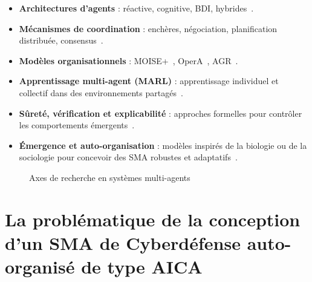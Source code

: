 \documentclass[ twoside,openright,titlepage,numbers=noenddot,headinclude,%
                footinclude=true,cleardoublepage=empty,abstractoff, %
                BCOR=5mm,paper=a4,fontsize=11pt,%
                french,american,%
                ]{scrreprt}
\begin{document}
\begin{itemize}
    \item \textbf{Architectures d'agents} : réactive, cognitive, BDI, hybrides~\cite{Georgeff1999}.
    \item \textbf{Mécanismes de coordination} : enchères, négociation, planification distribuée, consensus~\cite{Sandholm1999,Durfee1999}.
    \item \textbf{Modèles organisationnels} : MOISE+~\cite{Hubner2002,Hannoun2000}, OperA~\cite{Dignum2004}, AGR~\cite{Ferber2003}.
    \item \textbf{Apprentissage multi-agent (MARL)} : apprentissage individuel et collectif dans des environnements partagés~\cite{Zhang2021}.
    \item \textbf{Sûreté, vérification et explicabilité} : approches formelles pour contrôler les comportements émergents~\cite{Boella2008}.
    \item \textbf{Émergence et auto-organisation} : modèles inspirés de la biologie ou de la sociologie pour concevoir des SMA robustes et adaptatifs~\cite{DiMarzoSerugendo2005,Heylighen2001}.
\end{itemize}

\begin{figure}[h]
    \centering
    \caption{Axes de recherche en systèmes multi-agents}
    \label{fig:panorama_sma}
\end{figure}


\section{La problématique de la conception d'un SMA de Cyberdéfense auto-organisé de type AICA}\label{sec:problematique-sma-aica}
\end{document}
